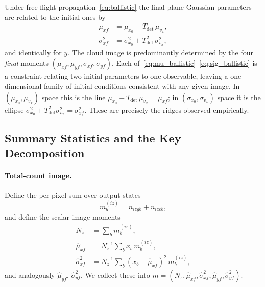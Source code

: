 \documentclass[11pt,a4paper]{article}
\begin{document}
Under free-flight propagation~\eqref{eq:ballistic} the final-plane Gaussian
parameters are related to the initial ones by
\begin{align}
  \mu_{xf}   &= \mu_{x_0} + T_\mathrm{det}\,\mu_{v_x},
  \label{eq:mu_ballistic}\\
  \sigma^2_{xf} &= \sigma^2_{x_0} + T_\mathrm{det}^2\,\sigma^2_{v_x},
  \label{eq:sig_ballistic}
\end{align}
and identically for $y$.  The cloud image is predominantly determined by the
four \emph{final} moments $(\mu_{xf}, \mu_{yf}, \sigma_{xf}, \sigma_{yf})$.
Each of~\eqref{eq:mu_ballistic}--\eqref{eq:sig_ballistic} is a constraint
relating two initial parameters to one observable, leaving a one-dimensional
family of initial conditions consistent with any given image.  In
$(\mu_{x_0}, \mu_{v_x})$ space this is the line
$\mu_{x_0} + T_\mathrm{det}\,\mu_{v_x} = \mu_{xf}$; in
$(\sigma_{x_0},\sigma_{v_x})$ space it is the ellipse
$\sigma^2_{x_0} + T_\mathrm{det}^2\sigma^2_{v_x} = \sigma^2_{xf}$.  These
are precisely the ridges observed empirically.

\subsection{Summary Statistics and the Key Decomposition}

\paragraph{Total-count image.}
Define the per-pixel sum over output states
\begin{equation}
  m_b^{(iz)} = n_{izgb} + n_{izeb},
  \label{eq:mtot}
\end{equation}
and define the scalar image moments
\begin{align}
  N_z     &= \textstyle\sum_b m_b^{(iz)},
  \label{eq:Nz}\\
  \hat\mu_{xf} &= N_z^{-1}\textstyle\sum_b x_b\,m_b^{(iz)},
  \label{eq:muxf}\\
  \hat\sigma^2_{xf} &= N_z^{-1}\textstyle\sum_b (x_b - \hat\mu_{xf})^2\,m_b^{(iz)},
  \label{eq:sigxf}
\end{align}
and analogously $\hat\mu_{yf}$, $\hat\sigma^2_{yf}$.
We collect these into $m = (N_z, \hat\mu_{xf}, \hat\sigma^2_{xf}, \hat\mu_{yf},
\hat\sigma^2_{yf})$.
\end{document}

